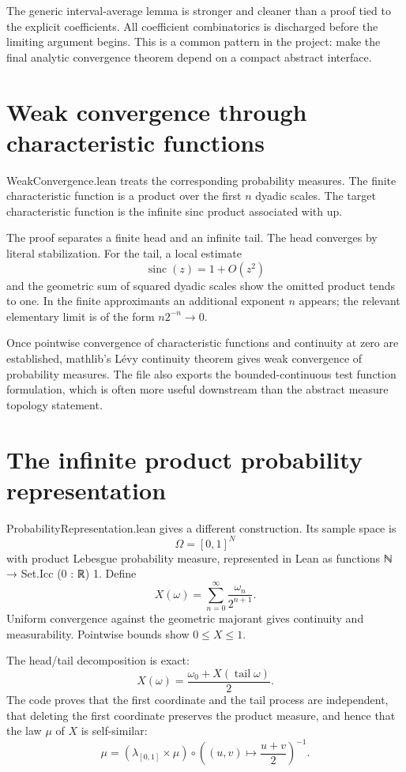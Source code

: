 \documentclass[11pt,a4paper,openany]{book}
\def\module#1{#1.lean}
\def\code#1{#1}
\def\upfun{up}
\def\N{N}
\newcommand{\N}{\ensuremath{\mathbb{N}}}
\newcommand{\upfun}{\ensuremath{\operatorname{up}}}
\newcommand{\module}[1]{\nolinkurl{#1.lean}}
\newcommand{\code}[1]{\texttt{\detokenize{#1}}}
\begin{document}
\begin{engineering}
The generic interval-average lemma is stronger and cleaner than a proof tied to
the explicit coefficients.  All coefficient combinatorics is discharged
before the limiting argument begins.  This is a common pattern in the project:
make the final analytic convergence theorem depend on a compact abstract
interface.
\end{engineering}

\section{Weak convergence through characteristic functions}
\module{WeakConvergence} treats the corresponding probability measures.  The
finite characteristic function is a product over the first $n$ dyadic scales.
The target characteristic function is the infinite sinc product associated
with \upfun.

The proof separates a finite head and an infinite tail.  The head converges by
literal stabilization.  For the tail, a local estimate
\[
 \operatorname{sinc}(z)=1+O(z^2)
\]
and the geometric sum of squared dyadic scales show the omitted product tends
to one.  In the finite approximants an additional exponent $n$ appears; the
relevant elementary limit is of the form $n2^{-n}\to0$.

Once pointwise convergence of characteristic functions and continuity at zero
are established, mathlib's Lévy continuity theorem gives weak convergence of
probability measures.  The file also exports the bounded-continuous test
function formulation, which is often more useful downstream than the abstract
measure topology statement.

\section{The infinite product probability representation}
\module{ProbabilityRepresentation} gives a different construction.  Its sample
space is
\[
 \Omega=[0,1]^{\N}
\]
with product Lebesgue probability measure, represented in Lean as functions
\code{ℕ → Set.Icc (0 : ℝ) 1}.  Define
\[
 X(\omega)=\sum_{n=0}^{\infty}\frac{\omega_n}{2^{n+1}}.
\]
Uniform convergence against the geometric majorant gives continuity and
measurability.  Pointwise bounds show $0\le X\le1$.

The head/tail decomposition is exact:
\[
 X(\omega)=\frac{\omega_0+X(\operatorname{tail}\omega)}2.
\]
The code proves that the first coordinate and the tail process are independent,
that deleting the first coordinate preserves the product measure, and hence
that the law $\mu$ of $X$ is self-similar:
\[
 \mu=(\lambda_{[0,1]}\times\mu)\circ
       \left((u,v)\mapsto\frac{u+v}{2}\right)^{-1}.
\]
\end{document}
